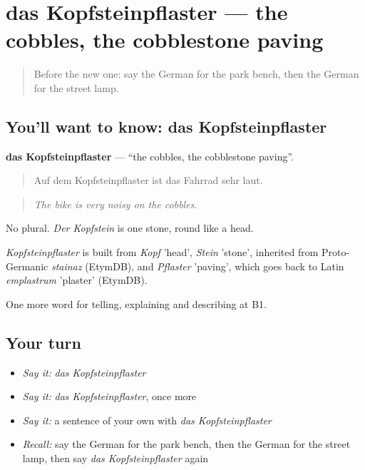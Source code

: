\section[das Kopfsteinpflaster]{das Kopfsteinpflaster — the cobbles, the cobblestone paving}

\label{lesson:GE-C440-kopfsteinpflaster}



\begin{quote}
Before the new one: say the German for the park bench, then the German for the street lamp.
\end{quote}

\subsection*{You'll want to know: das Kopfsteinpflaster}
\textbf{das Kopfsteinpflaster} — \textquotedblleft{}the cobbles, the cobblestone paving\textquotedblright{}.

\begin{quote}
Auf dem Kopfsteinpflaster ist das Fahrrad sehr laut.
\end{quote}

\begin{quote}
\emph{The bike is very noisy on the cobbles.}
\end{quote}

No plural. \emph{Der Kopfstein} is one stone, round like a head.

\begin{cousinweb}
\emph{Kopfsteinpflaster} is built from \emph{Kopf} 'head', \emph{Stein} 'stone', inherited from Proto-Germanic \emph{stainaz} (EtymDB), and \emph{Pflaster} 'paving', which goes back to Latin \emph{emplastrum} 'plaster' (EtymDB).
\end{cousinweb}

\begin{grammarlens}[title={What you've built}]
One more word for telling, explaining and describing at B1.
\end{grammarlens}

\subsection*{Your turn}
\begin{itemize}
\raggedright
  \item \emph{Say it:} \emph{das Kopfsteinpflaster}
  \item \emph{Say it:} \emph{das Kopfsteinpflaster}, once more
  \item \emph{Say it:} a sentence of your own with \emph{das Kopfsteinpflaster}
  \item \emph{Recall:} say the German for the park bench, then the German for the street lamp, then say \emph{das Kopfsteinpflaster} again
\end{itemize}

